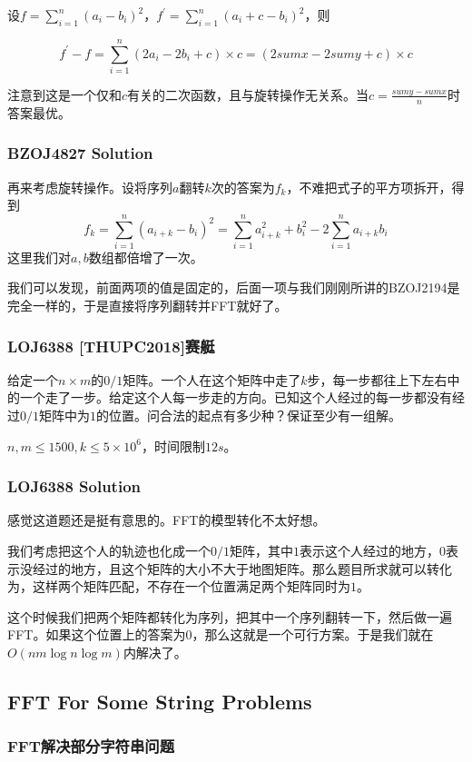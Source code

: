 \documentclass[10pt]{beamer}
\begin{document}
\begin{spacing}{1.2}
\begin{frame}
			设$\displaystyle f = \sum_{i=1}^{n}(a_i-b_i)^2$，$\displaystyle f^{\prime} = \sum_{i=1}^{n}(a_i+c-b_i)^2$，则

			$$f^{\prime}-f = \sum_{i=1}^{n}(2a_i -2b_i +c) \times c = (2sumx - 2sumy +c) \times c$$ \pause

			注意到这是一个仅和$c$有关的二次函数，且与旋转操作无关系。当$c = \frac{sumy-sumx}{n}$时答案最优。

		\end{frame}
		\begin{frame}
			\frametitle{BZOJ4827 Solution}

			再来考虑旋转操作。设将序列$a$翻转$k$次的答案为$f_k$，不难把式子的平方项拆开，得到
			$$f_k = \sum_{i=1}^{n}(a_{i+k}-b_i)^2 = \sum_{i=1}^{n}a_{i+k}^2 + b_i^2 - 2 \sum_{i=1}^{n}a_{i+k}b_i$$ \pause
			这里我们对$a,b$数组都倍增了一次。 \pause

			我们可以发现，前面两项的值是固定的，后面一项与我们刚刚所讲的BZOJ2194是完全一样的，于是直接将序列翻转并FFT就好了。

		\end{frame}
		\begin{frame}
			\frametitle{LOJ6388 [THUPC2018]赛艇}

			给定一个$n \times m$的$0/1$矩阵。一个人在这个矩阵中走了$k$步，每一步都往上下左右中的一个走了一步。给定这个人每一步走的方向。已知这个人经过的每一步都没有经过$0/1$矩阵中为$1$的位置。问合法的起点有多少种？保证至少有一组解。 \pause

			$n,m \le 1500,k \le 5 \times 10^6$，时间限制$12s$。

		\end{frame}
		\begin{frame}
			\frametitle{LOJ6388 Solution}

			感觉这道题还是挺有意思的。FFT的模型转化不太好想。 \pause

			我们考虑把这个人的轨迹也化成一个$0/1$矩阵，其中$1$表示这个人经过的地方，$0$表示没经过的地方，且这个矩阵的大小不大于地图矩阵。那么题目所求就可以转化为，这样两个矩阵匹配，不存在一个位置满足两个矩阵同时为$1$。 \pause

			这个时候我们把两个矩阵都转化为序列，把其中一个序列翻转一下，然后做一遍FFT。如果这个位置上的答案为$0$，那么这就是一个可行方案。于是我们就在$O(nm \log n \log m)$内解决了。

		\end{frame}
		\subsection{FFT For Some String Problems}
		\begin{frame}
			\frametitle{FFT解决部分字符串问题}


\end{frame}
\end{spacing}
\end{document}
